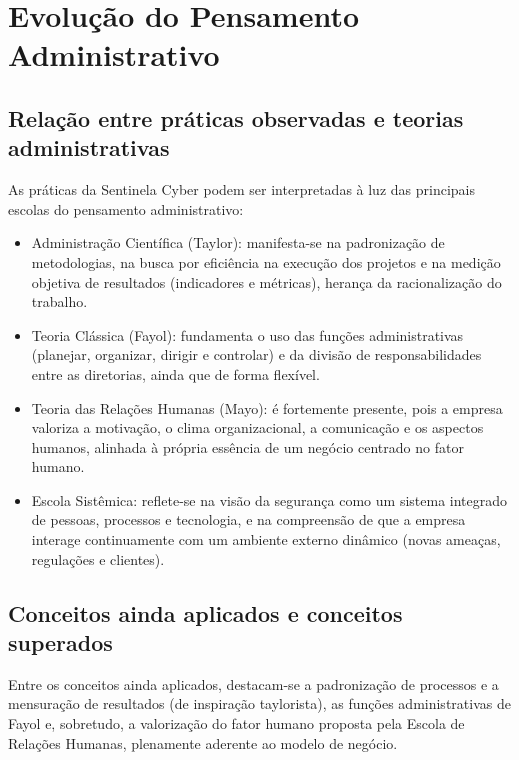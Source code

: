 \documentclass[12pt,a4paper]{article}
\begin{document}
\section{Evolução do Pensamento Administrativo}

\subsection{Relação entre práticas observadas e teorias administrativas}

As práticas da Sentinela Cyber podem ser interpretadas à luz das principais
escolas do pensamento administrativo:

\begin{itemize}[noitemsep]
  \item Administração Científica (Taylor): manifesta-se na padronização de
        metodologias, na busca por eficiência na execução dos projetos e na
        medição objetiva de resultados (indicadores e métricas), herança da
        racionalização do trabalho.
  \item Teoria Clássica (Fayol): fundamenta o uso das funções administrativas
        (planejar, organizar, dirigir e controlar) e da divisão de
        responsabilidades entre as diretorias, ainda que de forma flexível.
  \item Teoria das Relações Humanas (Mayo): é fortemente presente, pois a
        empresa valoriza a motivação, o clima organizacional, a comunicação e os
        aspectos humanos, alinhada à própria essência de um negócio centrado no
        fator humano.
  \item Escola Sistêmica: reflete-se na visão da segurança como um sistema
        integrado de pessoas, processos e tecnologia, e na compreensão de que a
        empresa interage continuamente com um ambiente externo dinâmico (novas
        ameaças, regulações e clientes).
\end{itemize}

\subsection{Conceitos ainda aplicados e conceitos superados}

Entre os conceitos ainda aplicados, destacam-se a padronização de processos e a
mensuração de resultados (de inspiração taylorista), as funções administrativas
de Fayol e, sobretudo, a valorização do fator humano proposta pela Escola de
Relações Humanas, plenamente aderente ao modelo de negócio.
\end{document}
